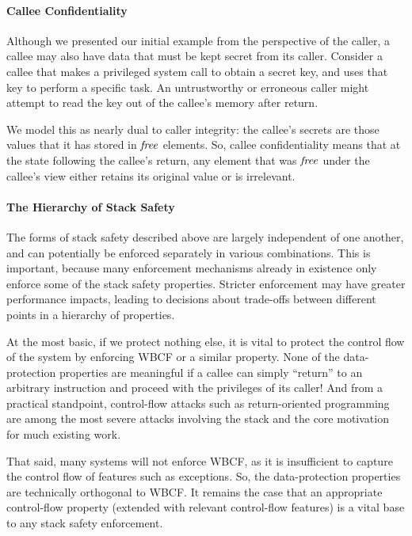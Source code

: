 \documentclass[10pt,conference]{ieeetran}%
\theoremstyle{definition}
\begin{document}
\paragraph*{Callee Confidentiality}

Although we presented our initial example from the perspective of the caller, a callee
may also have data that must be kept secret from its caller. Consider a callee that makes
a privileged system call to obtain a secret key, and uses that key to perform a specific
task. An untrustworthy or erroneous caller might attempt to read the key out of the callee's
memory after return.

We model this as nearly dual to caller integrity: the callee's secrets are those
values that it has stored in \(\mathit{free}\) elements. So, callee confidentiality means that
at the state following the callee's return, any element that was \(\mathit{free}\) under the
callee's view either retains its original value or is irrelevant.

\paragraph*{The Hierarchy of Stack Safety}

The forms of stack safety described above are largely independent of one another, and
can potentially be enforced separately in various combinations. This is important, because
many enforcement mechanisms already in existence only enforce some of the stack safety
properties. Stricter enforcement may have greater performance impacts, leading to decisions
about trade-offs between different points in a hierarchy of properties.

At the most basic, if we protect nothing else, it is vital to protect the control flow of the
system by enforcing WBCF or a similar property. None of the data-protection properties are
meaningful if a callee can simply ``return'' to an arbitrary instruction and proceed with
the privileges of its caller! And from a practical standpoint, control-flow attacks such
as return-oriented programming are among the most severe attacks involving the stack and
the core motivation for much existing work.

That said, many systems will not enforce WBCF, as it is insufficient to capture the
control flow of features such as exceptions. So, the data-protection properties are
technically orthogonal to WBCF. It remains the case that an appropriate control-flow
property (extended with relevant control-flow features) is a vital base to any stack safety
enforcement.
\end{document}

